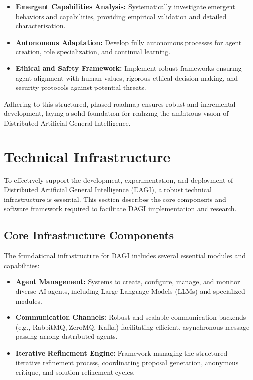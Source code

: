 \documentclass[12pt]{amsart}
\begin{document}
\begin{itemize}
    \item \textbf{Emergent Capabilities Analysis:} Systematically investigate emergent behaviors and capabilities, providing empirical validation and detailed characterization.
    \item \textbf{Autonomous Adaptation:} Develop fully autonomous processes for agent creation, role specialization, and continual learning.
    \item \textbf{Ethical and Safety Framework:} Implement robust frameworks ensuring agent alignment with human values, rigorous ethical decision-making, and security protocols against potential threats.
\end{itemize}

Adhering to this structured, phased roadmap ensures robust and incremental development, laying a solid foundation for realizing the ambitious vision of Distributed Artificial General Intelligence.



\section{Technical Infrastructure}

To effectively support the development, experimentation, and deployment of Distributed Artificial General Intelligence (DAGI), a robust technical infrastructure is essential. This section describes the core components and software framework required to facilitate DAGI implementation and research.

\subsection{Core Infrastructure Components}

The foundational infrastructure for DAGI includes several essential modules and capabilities:

\begin{itemize}
    \item \textbf{Agent Management:} Systems to create, configure, manage, and monitor diverse AI agents, including Large Language Models (LLMs) and specialized modules.
    \item \textbf{Communication Channels:} Robust and scalable communication backends (e.g., RabbitMQ, ZeroMQ, Kafka) facilitating efficient, asynchronous message passing among distributed agents.
    \item \textbf{Iterative Refinement Engine:} Framework managing the structured iterative refinement process, coordinating proposal generation, anonymous critique, and solution refinement cycles.
\end{itemize}
\end{document}

